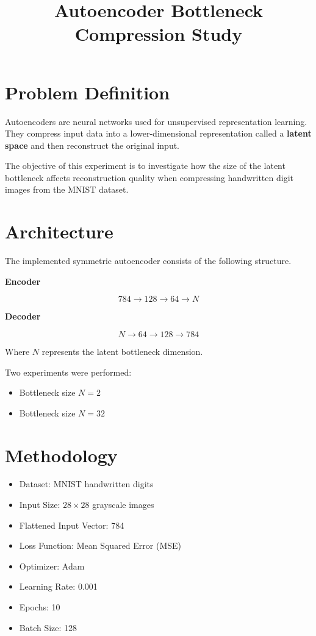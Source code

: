 \documentclass{article}
\title{Autoencoder Bottleneck Compression Study}
\author{}
\date{}
\begin{document}
\maketitle

\section{Problem Definition}

Autoencoders are neural networks used for unsupervised representation learning. 
They compress input data into a lower-dimensional representation called a \textbf{latent space} 
and then reconstruct the original input.

The objective of this experiment is to investigate how the size of the latent bottleneck affects 
reconstruction quality when compressing handwritten digit images from the MNIST dataset.

\section{Architecture}

The implemented symmetric autoencoder consists of the following structure.

\textbf{Encoder}

\[
784 \rightarrow 128 \rightarrow 64 \rightarrow N
\]

\textbf{Decoder}

\[
N \rightarrow 64 \rightarrow 128 \rightarrow 784
\]

Where \(N\) represents the latent bottleneck dimension.

Two experiments were performed:

\begin{itemize}
\item Bottleneck size \(N = 2\)
\item Bottleneck size \(N = 32\)
\end{itemize}

\section{Methodology}

\begin{itemize}
\item Dataset: MNIST handwritten digits
\item Input Size: \(28\times28\) grayscale images
\item Flattened Input Vector: 784
\item Loss Function: Mean Squared Error (MSE)
\item Optimizer: Adam
\item Learning Rate: 0.001
\item Epochs: 10
\item Batch Size: 128
\end{itemize}
\end{document}
